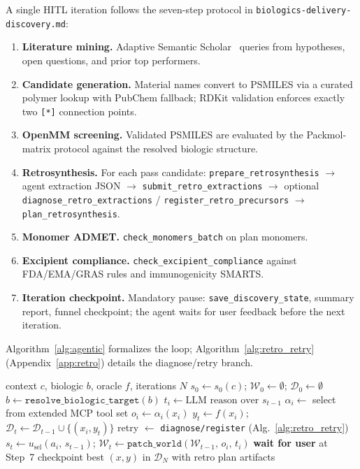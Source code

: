 \documentclass[twocolumn]{fairmeta}
\begin{document}
A single HITL iteration follows the seven-step protocol in \texttt{biologics-delivery-discovery.md}:
\begin{enumerate}
\item \textbf{Literature mining.} Adaptive Semantic Scholar~\cite{lo2020s2orc} queries from hypotheses, open questions, and prior top performers.
\item \textbf{Candidate generation.} Material names convert to PSMILES via a curated polymer lookup with PubChem fallback; RDKit validation enforces exactly two \texttt{[*]} connection points.
\item \textbf{OpenMM screening.} Validated PSMILES are evaluated by the Packmol-matrix protocol against the resolved biologic structure.
\item \textbf{Retrosynthesis.} For each pass candidate: \texttt{prepare\_retrosynthesis} $\to$ agent extraction JSON $\to$ \texttt{submit\_retro\_extractions} $\to$ optional \texttt{diagnose\_retro\_extractions} / \texttt{register\_retro\_precursors} $\to$ \texttt{plan\_retrosynthesis}.
\item \textbf{Monomer ADMET.} \texttt{check\_monomers\_batch} on plan monomers.
\item \textbf{Excipient compliance.} \texttt{check\_excipient\_compliance} against FDA/EMA/GRAS rules and immunogenicity SMARTS.
\item \textbf{Iteration checkpoint.} Mandatory pause: \texttt{save\_discovery\_state}, summary report, funnel checkpoint; the agent waits for user feedback before the next iteration.
\end{enumerate}

Algorithm~\ref{alg:agentic} formalizes the loop; Algorithm~\ref{alg:retro_retry} (Appendix~\ref{app:retro}) details the diagnose/retry branch.

\begin{algorithm}[t]
\caption{Extended Agentic Discovery Loop}\label{alg:agentic}
\small
\begin{algorithmic}[1]
\Require context $c$, biologic $b$, oracle $f$, iterations $N$
\State $s_0 \gets s_0(c)$; $\mathcal{W}_0 \gets \emptyset$; $\mathcal{D}_0 \gets \emptyset$
\State $b \gets \texttt{resolve\_biologic\_target}(b)$
  \State $t_i \gets \text{LLM reason over } s_{t-1}$
  \State $\alpha_i \gets$ select from extended MCP tool set
  \State $o_i \gets \alpha_i(x_i)$
    \State $y_t \gets f(x_i)$; $\mathcal{D}_t \gets \mathcal{D}_{t-1} \cup \{(x_i, y_t)\}$
    \State retry $\gets$ \texttt{diagnose/register} (Alg.~\ref{alg:retro_retry})
  \EndIf
  \State $s_t \gets u_\text{sel}(a_i,\, s_{t-1})$; $\mathcal{W}_t \gets \texttt{patch\_world}(\mathcal{W}_{t-1},\, o_i,\, t_i)$
  \State \textbf{wait for user} at Step~7 checkpoint
\EndFor
\State \Return best $(x, y)$ in $\mathcal{D}_N$ with retro plan artifacts
\end{algorithmic}
\end{algorithm}
\end{document}
